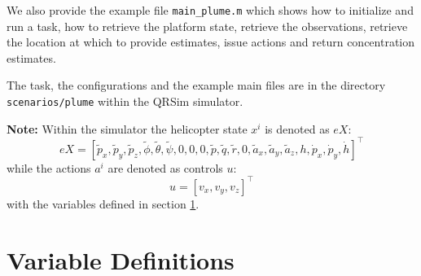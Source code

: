 \documentclass[a4paper,11pt]{report}
\newcommand{\sname}{QRSim\xspace}
\newcommand\mytexttt[1]{\texttt{\hyphenchar\font=45\relax #1}}
\begin{document}
We also provide the example file \texttt{main\_plume.m} which shows how to initialize and run a task, how to retrieve the platform state, retrieve the observations, retrieve the location at which to provide estimates, issue actions and return concentration estimates.

The task, the configurations and the example main files are in the directory \mytexttt{scenarios/plume} within the \sname simulator. 

\textbf{Note:}
Within the simulator the helicopter state $x^i$ is denoted as $eX$:
$$eX = [\tilde{p}_x,\tilde{p}_y,\tilde{p}_z,\tilde{\phi},\tilde{\theta},\tilde{\psi},0,0,0,\tilde{p},\tilde{q},\tilde{r},0,\tilde{a}_x,\tilde{a}_y,\tilde{a}_z,h,\dot{p}_x,\dot{p}_y,\dot{h}]^\intercal$$
while the actions $a^i$ are denoted as controls $u$:
$$u=[v_x,v_y,v_z]^\intercal$$
with the variables defined in section \ref{tab:naming}.

\newpage

\appendix

\chapter{Variable Definitions}\label{tab:naming}
\end{document}
